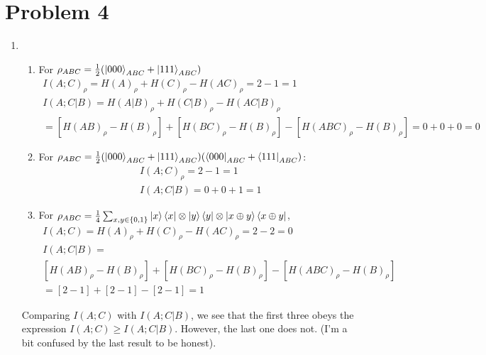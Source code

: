 \documentclass[12pt]{article}%
\begin{document}
\section*{Problem 4}
\begin{enumerate}
  \item
  \begin{enumerate}
    \item
      For $\rho_{ABC} = \frac{1}{2}(\ket{000}_{ABC} + \ket{111}_{ABC})$
      \begin{gather*}
        I(A;C)_{\rho} = H(A)_{\rho} + H(C)_{\rho} - H(AC)_{\rho} = 2 - 1 = \boxed{1} \\
        I(A; C\vert B) = H(A \vert B)_{\rho} + H(C \vert B)_{\rho} - H(AC \vert B)_{\rho} \\
        = [H(AB)_{\rho} - H(B)_{\rho}] + [H(BC)_{\rho} - H(B)_{\rho}] - [H(ABC)_{\rho} - H(B)_{\rho}] = 0 + 0 + 0 = \boxed{0}
      \end{gather*}
      \item
      For $\rho_{ABC} = \frac{1}{2}(\ket{000}_{ABC} + \ket{111}_{ABC})(\bra{000}_{ABC} + \bra{111}_{ABC})$:
      \begin{gather*}
        I(A;C)_{\rho} = 2 - 1 = \boxed{1} \\
        I(A; C\vert B) = 0 + 0 + 1 = \boxed{1}
      \end{gather*}
      \item
      For $\rho_{ABC} = \frac{1}{4}\sum_{x,y \in \{0,1\}} \ket{x}\bra{x} \otimes \ket{y}\bra{y} \otimes \ket{x \oplus y}\bra{x \oplus y} $,
      \begin{gather*}
        I(A;C) = H(A)_{\rho} + H(C)_{\rho} - H(AC)_{\rho} = 2 - 2 = \boxed{0} \\
        I(A; C\vert B) = \\ [H(AB)_{\rho} - H(B)_{\rho}] + [H(BC)_{\rho} - H(B)_{\rho}] - [H(ABC)_{\rho} - H(B)_{\rho}] \\
        = [2-1] + [2-1] - [2-1] =\boxed{1}
      \end{gather*}
  \end{enumerate}
  Comparing $I(A;C)$ with $I(A;C\vert B)$, we see that the first three obeys the expression $I(A;C) \geq I(A;C\vert B)$. However, the last one does not.
  (I'm a bit confused by the last result to be honest).


\end{enumerate}
\end{document}
